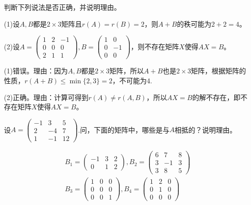 \documentclass[a4paper]{report}
\begin{document}
\EX 判断下列说法是否正确，并说明理由。

(1)设$A,B$都是$2\times3$矩阵且$r(A)=r(B)=2$，则$A+B$的秩可能为$2+2=4$。

(2)设$A=
\begin{pmatrix}
1&2&-1\\
0&0&0\\
2&1&1
\end{pmatrix},B=
\begin{pmatrix}
1&0\\
0&-1\\
0&0
\end{pmatrix}
$，则不存在矩阵$X$使得$AX=B$。

\begin{jie}
(1)错误。理由：因为$A,B$都是$2\times3$矩阵，所以$A+B$也是$2\times3$矩阵，根据矩阵的性质，$r(A+B)\leq \min\{2,3\}=2$，不可能为4.

(2)正确。理由：计算可得到$r(A)\neq r(A,B)$，所以$AX=B$的解不存在，即不存在矩阵$X$使得$AX=B$。
\end{jie}

\EX 设$A=
\begin{pmatrix}
-1&3&5\\
2&-4&7\\
1&-1&12
\end{pmatrix}
$.问，下面的矩阵中，哪些是与$A$相抵的？说明理由。

\begin{gather*}
B_1=
\begin{pmatrix}
-1&3&2\\ 0&1&2
\end{pmatrix},B_2=
\begin{pmatrix}
6&7&8\\
3&-1&3\\
3&8&5
\end{pmatrix}\\
B_3=
\begin{pmatrix}
1&0&0\\ 0&0&0\\ 0&0&1
\end{pmatrix},B_4=
\begin{pmatrix}
1&2&0\\
0&1&0\\
0&0&0
\end{pmatrix}
\end{gather*}
\end{document}
